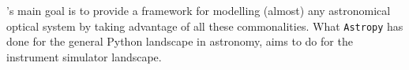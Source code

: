 \ScopeSim{}'s main goal is to provide a framework for modelling (almost) any astronomical optical system by taking advantage of all these commonalities.
What \lstinline{Astropy}\cite{astropy1, astropy2} has done for the general Python landscape in astronomy, \ScopeSim{} aims to do for the instrument simulator landscape.



